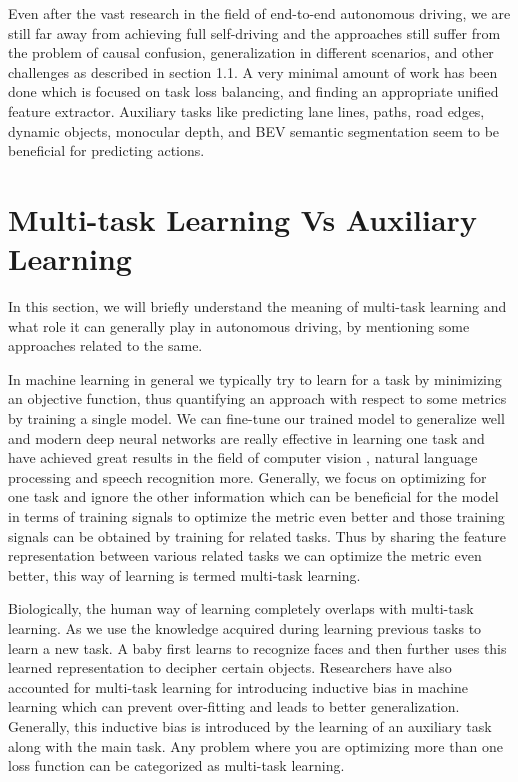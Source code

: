 Even after the vast research in the field of end-to-end autonomous driving, we are still far away from achieving full self-driving and the approaches still suffer from the problem of causal confusion, generalization in different scenarios, and other challenges as described in section 1.1. A very minimal amount of work has been done which is focused on task loss balancing, and finding an appropriate unified feature extractor. Auxiliary tasks like predicting lane lines, paths, road edges, dynamic objects, monocular depth, and BEV semantic segmentation seem to be beneficial for predicting actions.

    \section{Multi-task Learning Vs Auxiliary Learning}
    
    In this section, we will briefly understand the meaning of multi-task learning and what role it can generally play in autonomous driving, by mentioning some approaches related to the same. 
    
    In machine learning in general we typically try to learn for a task by minimizing an objective function, thus quantifying an approach with respect to some metrics by training a single model. We can fine-tune our trained model to generalize well and modern deep neural networks are really effective in learning one task and have achieved great results in the field of computer vision \cite{DBLP:journals/corr/KaiserGSVPJU17} \cite{DBLP:journals/corr/abs-1904-08492}, natural language processing \cite{DBLP:journals/corr/KaiserGSVPJU17} and speech recognition \cite{DBLP:journals/corr/ToshniwalTLL17} more. Generally, we focus on optimizing for one task and ignore the other information which can be beneficial for the model in terms of training signals to optimize the metric even better and those training signals can be obtained by training for related tasks. Thus by sharing the feature representation between various related tasks we can optimize the metric even better, this way of learning is termed multi-task learning. 
    
    Biologically, the human way of learning completely overlaps with multi-task learning. As we use the knowledge acquired during learning previous tasks to learn a new task. A baby first learns to recognize faces and then further uses this learned representation to decipher certain objects. Researchers have also accounted for multi-task learning for introducing inductive bias in machine learning which can prevent over-fitting and leads to better generalization. Generally, this inductive bias is introduced by the learning of an auxiliary task along with the main task. Any problem where you are optimizing more than one loss function can be categorized as multi-task learning. 
    
